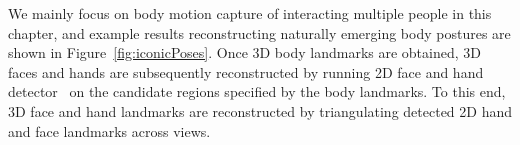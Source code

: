We mainly focus on body motion capture of interacting multiple people in this chapter, and example results reconstructing naturally emerging body postures are shown in Figure~\ref{fig:iconicPoses}. Once 3D body landmarks are obtained, 3D faces and hands are subsequently reconstructed by running 2D face and hand detector~\cite{simon2017hand} on the candidate regions specified by the body landmarks. To this end, 3D face and hand landmarks are reconstructed by triangulating detected 2D hand and face landmarks across views. 


